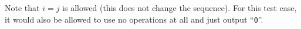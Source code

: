 \remainingsamples
Note that $i=j$ is allowed (this does not change the sequence).
For this test case, it would also be allowed to use no operations at all and just output ``\texttt{0}''.